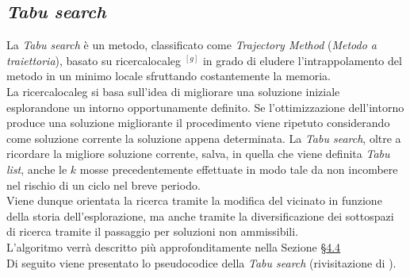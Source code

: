 \subsection{\textit{Tabu search}}
\noindent La \textit{Tabu search} \cite{site:dispense-de-giovanni} è un metodo, classificato come \textit{Trajectory Method} (\textit{Metodo a traiettoria}), basato su \gls{ricercalocaleg} $^{[g]}$
in grado di eludere l'intrappolamento del metodo in un minimo locale sfruttando costantemente la memoria.\\
La \gls{ricercalocaleg} si basa sull’idea di migliorare
una soluzione iniziale esplorandone un intorno
opportunamente definito. Se l’ottimizzazione
dell’intorno produce una soluzione migliorante
il procedimento viene ripetuto
considerando come soluzione corrente la soluzione
appena determinata.
La \textit{Tabu search}, oltre a ricordare la migliore soluzione corrente, salva, in quella che viene definita \textit{Tabu list},
anche le {$k$} mosse precedentemente effettuate in modo tale da non incombere nel rischio di un ciclo nel breve periodo.\\
Viene dunque orientata la ricerca tramite la modifica del vicinato in funzione della storia dell'esplorazione, ma anche tramite la diversificazione dei sottospazi
di ricerca tramite il passaggio per soluzioni non ammissibili.\\
L'algoritmo verrà descritto più approfonditamente nella Sezione §\hyperref[sec:tabu-search]{4.4}\\
Di seguito viene presentato lo pseudocodice della \textit{Tabu search} (rivisitazione di \cite{site:solid-github}).\\

